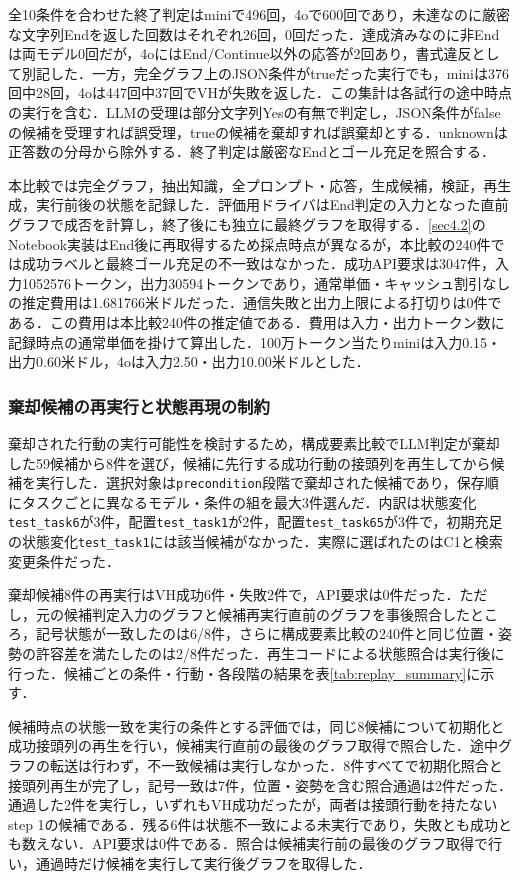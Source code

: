 全10条件を合わせた終了判定はminiで496回，4oで600回であり，未達なのに厳密な文字列Endを返した回数はそれぞれ26回，0回だった．達成済みなのに非Endは両モデル0回だが，4oにはEnd/Continue以外の応答が2回あり，書式違反として別記した．一方，完全グラフ上のJSON条件がtrueだった実行でも，miniは376回中28回，4oは447回中37回でVHが失敗を返した．この集計は各試行の途中時点の実行を含む．LLMの受理は部分文字列Yesの有無で判定し，JSON条件がfalseの候補を受理すれば誤受理，trueの候補を棄却すれば誤棄却とする．unknownは正答数の分母から除外する．終了判定は厳密なEndとゴール充足を照合する．

本比較では完全グラフ，抽出知識，全プロンプト・応答，生成候補，検証，再生成，実行前後の状態を記録した．評価用ドライバはEnd判定の入力となった直前グラフで成否を計算し，終了後にも独立に最終グラフを取得する．\ref{sec4.2}のNotebook実装はEnd後に再取得するため採点時点が異なるが，本比較の240件では成功ラベルと最終ゴール充足の不一致はなかった．成功API要求は3047件，入力1052576トークン，出力30594トークンであり，通常単価・キャッシュ割引なしの推定費用は1.681766米ドルだった．通信失敗と出力上限による打切りは0件である．この費用は本比較240件の推定値である．費用は入力・出力トークン数に記録時点の通常単価を掛けて算出した．100万トークン当たりminiは入力0.15・出力0.60米ドル，4oは入力2.50・出力10.00米ドルとした．

\subsubsection{棄却候補の再実行と状態再現の制約}\label{sec5.replay}
棄却された行動の実行可能性を検討するため，構成要素比較でLLM判定が棄却した59候補から8件を選び，候補に先行する成功行動の接頭列を再生してから候補を実行した．選択対象は\texttt{precondition}段階で棄却された候補であり，保存順にタスクごとに異なるモデル・条件の組を最大3件選んだ．内訳は状態変化\texttt{test\_task6}が3件，配置\texttt{test\_task1}が2件，配置\texttt{test\_task65}が3件で，初期充足の状態変化\texttt{test\_task1}には該当候補がなかった．実際に選ばれたのはC1と検索変更条件だった．

棄却候補8件の再実行はVH成功6件・失敗2件で，API要求は0件だった．ただし，元の候補判定入力のグラフと候補再実行直前のグラフを事後照合したところ，記号状態が一致したのは6/8件，さらに構成要素比較の240件と同じ位置・姿勢の許容差を満たしたのは2/8件だった．再生コードによる状態照合は実行後に行った．候補ごとの条件・行動・各段階の結果を表\ref{tab:replay_summary}に示す．

候補時点の状態一致を実行の条件とする評価では，同じ8候補について初期化と成功接頭列の再生を行い，候補実行直前の最後のグラフ取得で照合した．途中グラフの転送は行わず，不一致候補は実行しなかった．8件すべてで初期化照合と接頭列再生が完了し，記号一致は7件，位置・姿勢を含む照合通過は2件だった．通過した2件を実行し，いずれもVH成功だったが，両者は接頭行動を持たないstep 1の候補である．残る6件は状態不一致による未実行であり，失敗とも成功とも数えない．API要求は0件である．照合は候補実行前の最後のグラフ取得で行い，通過時だけ候補を実行して実行後グラフを取得した．

